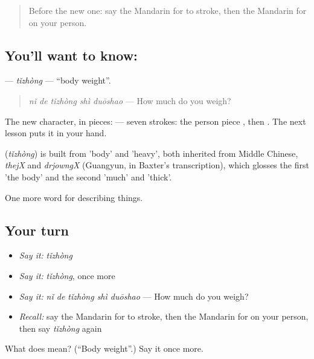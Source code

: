 \label{lesson:ZH-C230-tizhong}



\begin{quote}
Before the new one: say the Mandarin for to stroke, then the Mandarin for on your person.
\end{quote}

\subsection*{You'll want to know: }
\textbf{} — \emph{tǐzhòng} — \textquotedblleft{}body weight\textquotedblright{}.

\begin{quote}
\textbf{} \emph{nǐ de tǐzhòng shì duōshao} — How much do you weigh?
\end{quote}

The new character, in pieces:  — seven strokes: the person piece , then . The next lesson puts it in your hand.

\begin{cousinweb}
\textbf{} (\emph{tǐzhòng}) is built from  'body' and  'heavy', both inherited from Middle Chinese, \emph{thejX} and \emph{drjowngX} (Guangyun, in Baxter's transcription), which glosses the first 'the body' and the second 'much' and 'thick'.
\end{cousinweb}

\begin{grammarlens}[title={What you've built}]
One more word for describing things.
\end{grammarlens}

\subsection*{Your turn}
\begin{itemize}
\raggedright
  \item \emph{Say it:} \emph{tǐzhòng}
  \item \emph{Say it:} \emph{tǐzhòng}, once more
  \item \emph{Say it:} \emph{nǐ de tǐzhòng shì duōshao} — How much do you weigh?
  \item \emph{Recall:} say the Mandarin for to stroke, then the Mandarin for on your person, then say \emph{tǐzhòng} again
\end{itemize}

\begin{tcolorbox}[breakable,colback=teal!4,colframe=teal!35!black,title={Before you move on}]
What does  mean? (\textquotedblleft{}Body weight\textquotedblright{}.) Say it once more.
\end{tcolorbox}
